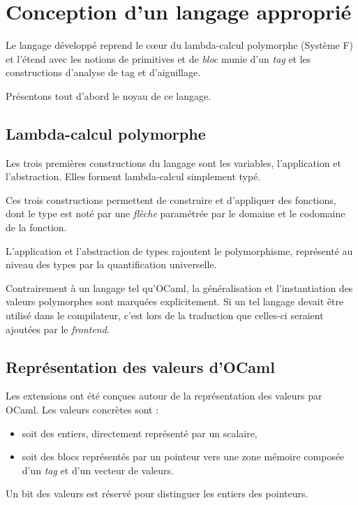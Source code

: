 \chapter{Conception d'un langage approprié}

Le langage développé reprend le cœur du lambda-calcul polymorphe (Système F)
et l'étend avec les notions de primitives et de \emph{bloc} munie d'un
\emph{tag} et les constructions d'analyse de tag et d'aiguillage.

Présentons tout d'abord le noyau de ce langage.

\section{Lambda-calcul polymorphe} 

Les trois premières constructions du langage sont les variables, l'application
et l'abstraction. Elles forment lambda-calcul simplement typé.

Ces trois constructions permettent de construire et d'appliquer des fonctions,
dont le type est noté par une \emph{flèche} paramétrée par le domaine et le
codomaine de la fonction.

L'application et l'abstraction de types rajoutent le polymorphisme, représenté
au niveau des types par la quantification universelle.

Contrairement à un langage tel qu'OCaml, la généralisation et l'instantiation
des valeurs polymorphes sont marquées explicitement. Si un tel langage devait
être utilisé dans le compilateur, c'est lors de la traduction que celles-ci
seraient ajoutées par le \emph{frontend}.

\section{Représentation des valeurs d'OCaml}

Les extensions ont été conçues autour de la représentation des valeurs par
OCaml. Les valeurs concrètes sont :
\begin{itemize}
  \item soit des entiers, directement représenté par un scalaire,
  \item soit des blocs représentés par un pointeur vers une
zone mémoire composée d'un \emph{tag} et d'un vecteur de valeurs.
\end{itemize}
Un bit des valeurs est réservé pour distinguer les entiers des pointeurs.

